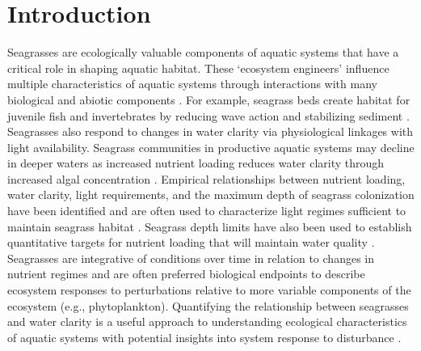 \documentclass[letterpaper,12pt,oneside]{article}\usepackage[]{graphicx}\usepackage[]{color}
\begin{document}
\clearpage

\acresetall

\section{Introduction}

Seagrasses are ecologically valuable components of aquatic systems that have a critical role in shaping aquatic habitat.  These `ecosystem engineers' influence multiple characteristics of aquatic systems through interactions with many biological and abiotic components \citep{Jones94,Koch01}.  For example, seagrass beds create habitat for juvenile fish and invertebrates by reducing wave action and stabilizing sediment \citep{williams01,Hughes09}.  Seagrasses also respond to changes in water clarity via physiological linkages with light availability.  Seagrass communities in productive aquatic systems may decline in deeper waters as increased nutrient loading reduces water clarity through increased algal concentration \citep{Duarte95}.  Empirical relationships between nutrient loading, water clarity, light requirements, and the maximum depth of seagrass colonization have been identified \citep{Duarte91,Kenworthy96,Choice14} and are often used to characterize light regimes sufficient to maintain seagrass habitat \citep{Steward05}.  Seagrass depth limits have also been used to establish quantitative targets for nutrient loading that will maintain water quality \citep{Janicki96}.  Seagrasses are integrative of conditions over time in relation to changes in nutrient regimes \citep{Duarte95} and are often preferred biological endpoints to describe ecosystem responses to perturbations relative to more variable components of the ecosystem (e.g., phytoplankton).  Quantifying the relationship between seagrasses and water clarity is a useful approach to understanding ecological characteristics of aquatic systems with potential insights into system response to disturbance \citep{Greve05}.    
\end{document}
